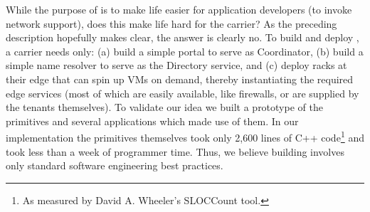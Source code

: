While the purpose of \name is to make life easier for application developers (to invoke network support), does this make life hard for the carrier? As the preceding description hopefully makes clear, the answer is clearly no.  To build and deploy \name, a carrier needs only: (a) build a simple portal to serve as Coordinator, (b) build a simple name resolver to serve as the Directory service, and (c) deploy racks at their edge that can spin up VMs on demand, thereby instantiating the required edge services (most of which are easily available, like firewalls, or are supplied by the tenants themselves). To validate our idea we built a prototype of the primitives and several applications which made use of them. In our implementation the primitives themselves took only 2,600 lines of C++ code\footnote{As measured by David A. Wheeler's SLOCCount tool.} and took less than a week of programmer time. Thus, we believe building \name involves only standard software engineering best practices.

